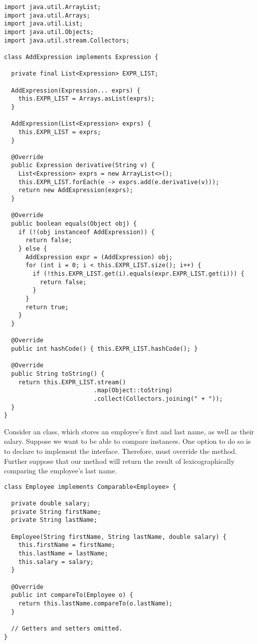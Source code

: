 \begin{lstlisting}[language=MyJava]
import java.util.ArrayList;
import java.util.Arrays;
import java.util.List;
import java.util.Objects;
import java.util.stream.Collectors;

class AddExpression implements Expression {

  private final List<Expression> EXPR_LIST;

  AddExpression(Expression... exprs) {
    this.EXPR_LIST = Arrays.asList(exprs);
  }

  AddExpression(List<Expression> exprs) { 
    this.EXPR_LIST = exprs; 
  }

  @Override
  public Expression derivative(String v) {
    List<Expression> exprs = new ArrayList<>();
    this.EXPR_LIST.forEach(e -> exprs.add(e.derivative(v)));
    return new AddExpression(exprs);
  }

  @Override
  public boolean equals(Object obj) {
    if (!(obj instanceof AddExpression)) { 
      return false; 
    } else { 
      AddExpression expr = (AddExpression) obj;
      for (int i = 0; i < this.EXPR_LIST.size(); i++) {
        if (!this.EXPR_LIST.get(i).equals(expr.EXPR_LIST.get(i))) { 
          return false; 
        }
      }
      return true;
    }
  }

  @Override
  public int hashCode() { this.EXPR_LIST.hashCode(); }

  @Override
  public String toString() { 
    return this.EXPR_LIST.stream()
                         .map(Object::toString)
                         .collect(Collectors.joining(" + "));
  }
}
\end{lstlisting}

Consider an  class, which stores an employee's first and last name, as well as their salary. 
Suppose we want to be able to compare  instances. 
One option to do so is to declare  to implement the  interface. 
Therefore,  must override the  method. 
Further suppose that our method will return the result of lexicographically comparing the employee's last name.

\begin{lstlisting}[language=MyJava]
class Employee implements Comparable<Employee> {

  private double salary;
  private String firstName;
  private String lastName;

  Employee(String firstName, String lastName, double salary) {
    this.firstName = firstName;
    this.lastName = lastName;
    this.salary = salary;
  }

  @Override
  public int compareTo(Employee o) {
    return this.lastName.compareTo(o.lastName);
  }

  // Getters and setters omitted.
}
\end{lstlisting}


